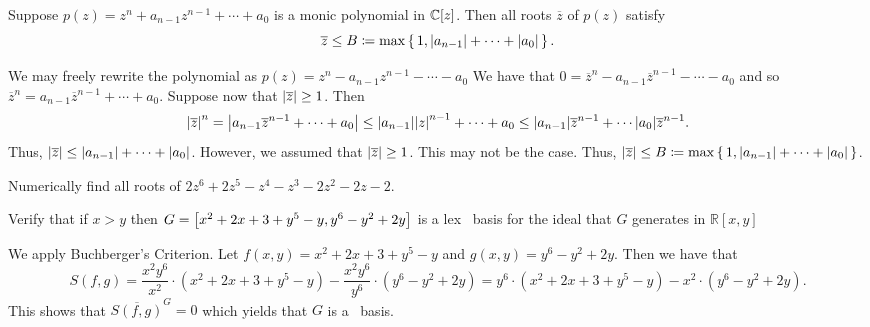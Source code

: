 \documentclass[letterpaper, 11pt, oneside]{book}
\begin{document}
\begin{exercise}\label{ex:UAG_2.1.1}

\end{exercise}

\begin{exercise}\label{ex:UAG_2.1.2}

\end{exercise}

\begin{exercise}\label{ex:UAG_2.1.3}
  Suppose $p(z) = z^{n} + a_{n - 1}z^{n - 1} + \cdots + a_{0}$ is a monic polynomial in $\mathbb{C}[z]$.
  Then all roots $\overline{z}$ of $p(z)$ satisfy
  \[
    \overline{z} \leq B \coloneqq \max\set{1, \abs{a_{n - 1}} + \cdots + \abs{a_{0}}}.
  \]
\end{exercise}
\begin{pf}
  We may freely rewrite the polynomial as $p(z) = z^{n} - a_{n - 1}z^{n - 1} - \cdots - a_{0}$
  We have that $0 = \overline{z}^{n} - a_{n - 1}\overline{z}^{n - 1} - \cdots - a_{0}$ and so $\overline{z}^{n} = a_{n - 1}\overline{z}^{n - 1} + \cdots + a_{0}$.
  Suppose now that $\abs{\overline{z}} \geq 1$.
  Then
  \[
    \abs{\overline{z}}^{n} = \abs{a_{n - 1}\overline{z}^{n - 1} + \cdots + a_{0}} \leq \abs{a_{n - 1}}\abs{z}^{n - 1} + \cdots + a_{0} \leq \abs{a_{n - 1}}\overline{z}^{n - 1} + \cdots \abs{a_{0}}\overline{z}^{n - 1}.
  \]
  Thus, $\abs{\overline{z}} \leq \abs{a_{n - 1}} + \cdots + \abs{a_{0}}$.
  However, we assumed that $\abs{\overline{z}} \geq 1$.
  This may not be the case.
  Thus, $\abs{\overline{z}} \leq B \coloneqq \max\set{1, \abs{a_{n - 1}} + \cdots + \abs{a_{0}}}$.
\end{pf}

\begin{exercise}\label{ex:UAG_2.1.4}
  Numerically find all roots of $2z^{6} + 2z^{5} - z^{4} - z^{3} - 2z^{2} - 2z - 2$.
\end{exercise}

\clearpage

\begin{exercise}\label{ex:UAG_2.1.5}
  Verify that if $x > y$ then $G = \bqty{x^{2} + 2x + 3 + y^{5} - y, y^{6} - y^{2} + 2y}$ is a lex \Grobner\ basis for the ideal that $G$ generates in $\mathbb{R}[x, y]$
\end{exercise}
\begin{pf}
  We apply Buchberger's Criterion.
  Let $f(x, y) = x^{2} + 2x + 3 + y^{5} - y$ and $g(x, y) = y^{6} - y^{2} + 2y$.
  Then we have that
  \[
    S(f, g) = \frac{x^{2}y^{6}}{x^{2}} \cdot (x^{2} + 2x + 3 + y^{5} - y) - \frac{x^{2}y^{6}}{y^{6}} \cdot (y^{6} - y^{2} + 2y) = y^{6} \cdot (x^{2} + 2x + 3 + y^{5} - y) - x^{2} \cdot (y^{6} - y^{2} + 2y).
  \]
  This shows that $\overline{S(f, g)}^{G} = 0$ which yields that $G$ is a \Grobner\ basis.
\end{pf}
\end{document}

